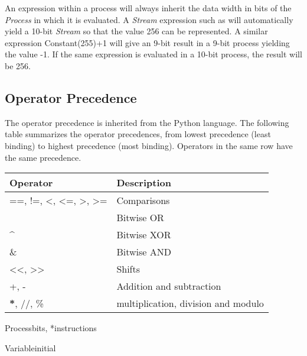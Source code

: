 \documentclass[letterpaper,10pt,english]{manual}
\begin{document}
An expression within a process will always inherit the data width in bits of
the \emph{Process} in which it is evaluated. A \emph{Stream} expression such as
 will automatically yield a 10-bit \emph{Stream} so that the
value 256 can be represented. A similar expression Constant(255)+1 will give an
9-bit result in a 9-bit process yielding the value -1. If the same expression
is evaluated in a 10-bit process, the result will be 256.


\subsection{Operator Precedence}

The operator precedence is inherited from the Python language. The following
table summarizes the operator precedences, from lowest precedence (least
binding) to highest precedence (most binding). Operators in the same row have
the same precedence.

\begin{tabulary}{\textwidth}{|L|L|}
\hline
\textbf{
Operator
} & \textbf{
Description
}\\
\hline

==, !=, \textless{}, \textless{}=, \textgreater{}, \textgreater{}=
 & 
Comparisons
\\
{\raggedright{}~}
 & 
Bitwise OR
\\

\textasciicircum{}
 & 
Bitwise XOR
\\

\&
 & 
Bitwise AND
\\

\textless{}\textless{}, \textgreater{}\textgreater{}
 & 
Shifts
\\

+, -
 & 
Addition and subtraction
\\

{\color{red}\bfseries{}*}, //, \%
 & 
multiplication, division and modulo
\\
\hline
\end{tabulary}


\hypertarget{chips.Process}{}\begin{classdesc}{Process}{bits, *instructions}\end{classdesc}

\hypertarget{chips.Variable}{}\begin{classdesc}{Variable}{initial}\end{classdesc}
\end{document}
